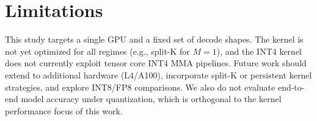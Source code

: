 \section{Limitations}
This study targets a single GPU and a fixed set of decode shapes. The kernel is
not yet optimized for all regimes (e.g., split-K for $M=1$), and the INT4 kernel
does not currently exploit tensor core INT4 MMA pipelines. Future work should
extend to additional hardware (L4/A100), incorporate split-K or persistent
kernel strategies, and explore INT8/FP8 comparisons. We also do not evaluate
end-to-end model accuracy under quantization, which is orthogonal to the kernel
performance focus of this work.
